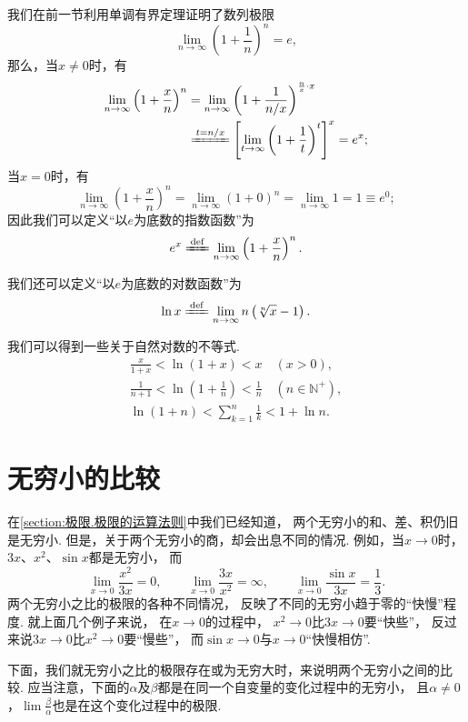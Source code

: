 我们在前一节利用单调有界定理证明了数列极限\[
\lim_{n\to\infty} \left(1+\frac{1}{n}\right)^n = e,
\]
那么，当\(x\neq0\)时，有
\begin{align*}
\lim_{n\to\infty} \left(1+\frac{x}{n}\right)^n
&= \lim_{n\to\infty} \left(1+\frac{1}{n/x}\right)^{\frac{n}{x} \cdot x} \\
&\xlongequal{t=n/x} \left[ \lim_{t\to\infty} \left(1+\frac{1}{t}\right)^t \right]^x
= e^x;
\end{align*}
当\(x=0\)时，有\[
\lim_{n\to\infty} \left(1+\frac{x}{n}\right)^n
= \lim_{n\to\infty} (1+0)^n
= \lim_{n\to\infty} 1
= 1 \equiv e^0;
\]
因此我们可以定义“以\(e\)为底数的指数函数”为
\begin{equation}\label{equation:特殊函数.以e为底数的指数函数的极限定义}
e^x
\defeq
\lim_{n\to\infty} \left(1+\frac{x}{n}\right)^n.
\end{equation}

我们还可以定义“以\(e\)为底数的对数函数”为
\begin{equation}\label{equation:特殊函数.以e为底数的对数函数的极限定义}
\ln x
\defeq
\lim_{n\to\infty} n \left( \sqrt[n]{x} - 1 \right).
\end{equation}

我们可以得到一些关于自然对数的不等式.
\begin{gather}
	\frac{x}{1+x} < \ln(1+x) < x
	\quad(x>0), \\
	\frac{1}{n+1} < \ln(1+\frac{1}{n}) < \frac{1}{n}
	\quad(n\in\mathbb{N}^+), \\
	\ln(1+n) < \sum_{k=1}^n \frac{1}{k} < 1 + \ln n.
\end{gather}

\section{无穷小的比较}
在\cref{section:极限.极限的运算法则}中我们已经知道，
两个无穷小的和、差、积仍旧是无穷小.
但是，关于两个无穷小的商，却会出息不同的情况.
例如，当\(x\to0\)时，
\(3x\)、\(x^2\)、\(\sin x\)都是无穷小，
而\[
	\lim_{x\to0}\frac{x^2}{3x}=0, \qquad
	\lim_{x\to0}\frac{3x}{x^2}=\infty, \qquad
	\lim_{x\to0}\frac{\sin x}{3x}=\frac{1}{3}.
\]
两个无穷小之比的极限的各种不同情况，
反映了不同的无穷小趋于零的“快慢”程度.
就上面几个例子来说，
在\(x\to0\)的过程中，
\(x^2\to0\)比\(3x\to0\)要“快些”，
反过来说\(3x\to0\)比\(x^2\to0\)要“慢些”，
而\(\sin x\to0\)与\(x\to0\)“快慢相仿”.

下面，我们就无穷小之比的极限存在或为无穷大时，来说明两个无穷小之间的比较.
应当注意，下面的\(\alpha\)及\(\beta\)都是在同一个自变量的变化过程中的无穷小，
且\(\alpha\neq0\)，\(\lim\frac{\beta}{\alpha}\)也是在这个变化过程中的极限.

